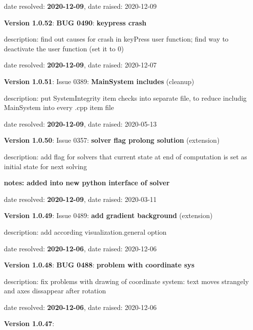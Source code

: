   \item   date resolved: {\bf 2020-12-09},
date raised: 2020-12-09   \ei
  \item {\bf Version 1.0.52}: \vspace{-6pt} 
{\bf \color{warningRed}  BUG 0490}: {\bf keypress crash}
  \bi
  \item {\small description: find out causes for crash in keyPress user function; find way to deactivate the user function (set it to 0)}
  \item   date resolved: {\bf 2020-12-09},
date raised: 2020-12-07   \ei
  \item {\bf Version 1.0.51}: \vspace{-6pt} 
  Issue 0389: {\bf MainSystem includes}
(cleanup)
  \bi
  \item {\small description: put SystemIntegrity item checks into separate file, to reduce includig MainSystem into every .cpp item file}
  \item   date resolved: {\bf 2020-12-09},
date raised: 2020-05-13   \ei
  \item {\bf Version 1.0.50}: \vspace{-6pt} 
  Issue 0357: {\bf solver flag prolong solution}
(extension)
  \bi
  \item {\small description: add flag for solvers that current state at end of computation is set as initial state for next solving}
  \item {\small \bf notes: added into new python interface of solver}
  \item   date resolved: {\bf 2020-12-09},
date raised: 2020-03-11   \ei
  \item {\bf Version 1.0.49}: \vspace{-6pt} 
  Issue 0489: {\bf add gradient background}
(extension)
  \bi
  \item {\small description: add according visualization.general option}
  \item   date resolved: {\bf 2020-12-06},
date raised: 2020-12-06   \ei
  \item {\bf Version 1.0.48}: \vspace{-6pt} 
{\bf \color{warningRed}  BUG 0488}: {\bf problem with coordinate sys}
  \bi
  \item {\small description: fix problems with drawing of coordinate system: text moves strangely and axes dissappear after rotation}
  \item   date resolved: {\bf 2020-12-06},
date raised: 2020-12-06   \ei
  \item {\bf Version 1.0.47}: \vspace{-6pt} 
